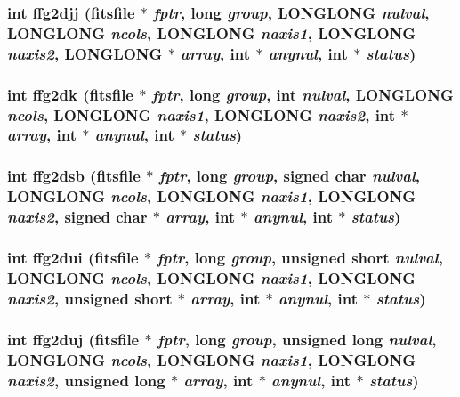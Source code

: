 \subsubsection{\setlength{\rightskip}{0pt plus 5cm}int ffg2djj (\bf{fitsfile} $\ast$ {\em fptr}, long {\em group}, \bf{LONGLONG} {\em nulval}, \bf{LONGLONG} {\em ncols}, \bf{LONGLONG} {\em naxis1}, \bf{LONGLONG} {\em naxis2}, \bf{LONGLONG} $\ast$ {\em array}, int $\ast$ {\em anynul}, int $\ast$ {\em status})}\label{fitsio_8h_b46c21e9a851140bf03249f872c2d376}


\subsubsection{\setlength{\rightskip}{0pt plus 5cm}int ffg2dk (\bf{fitsfile} $\ast$ {\em fptr}, long {\em group}, int {\em nulval}, \bf{LONGLONG} {\em ncols}, \bf{LONGLONG} {\em naxis1}, \bf{LONGLONG} {\em naxis2}, int $\ast$ {\em array}, int $\ast$ {\em anynul}, int $\ast$ {\em status})}\label{fitsio_8h_0e3f7de04e6af68b251804ffc843c800}


\subsubsection{\setlength{\rightskip}{0pt plus 5cm}int ffg2dsb (\bf{fitsfile} $\ast$ {\em fptr}, long {\em group}, signed char {\em nulval}, \bf{LONGLONG} {\em ncols}, \bf{LONGLONG} {\em naxis1}, \bf{LONGLONG} {\em naxis2}, signed char $\ast$ {\em array}, int $\ast$ {\em anynul}, int $\ast$ {\em status})}\label{fitsio_8h_7c7c41674f8eebae81c9a06454c600a8}


\subsubsection{\setlength{\rightskip}{0pt plus 5cm}int ffg2dui (\bf{fitsfile} $\ast$ {\em fptr}, long {\em group}, unsigned short {\em nulval}, \bf{LONGLONG} {\em ncols}, \bf{LONGLONG} {\em naxis1}, \bf{LONGLONG} {\em naxis2}, unsigned short $\ast$ {\em array}, int $\ast$ {\em anynul}, int $\ast$ {\em status})}\label{fitsio_8h_71805ed6df59798823e27f9e54376304}


\subsubsection{\setlength{\rightskip}{0pt plus 5cm}int ffg2duj (\bf{fitsfile} $\ast$ {\em fptr}, long {\em group}, unsigned long {\em nulval}, \bf{LONGLONG} {\em ncols}, \bf{LONGLONG} {\em naxis1}, \bf{LONGLONG} {\em naxis2}, unsigned long $\ast$ {\em array}, int $\ast$ {\em anynul}, int $\ast$ {\em status})}\label{fitsio_8h_3c7c26f18620aa474bccee38bd2bfac0}


